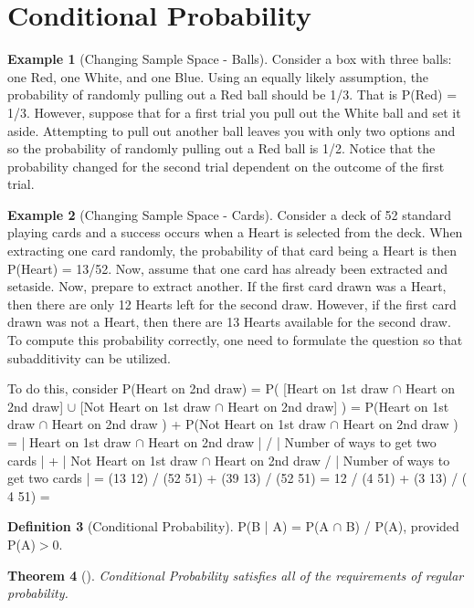 \documentclass[10pt,]{book}
\theoremstyle{plain}
\newtheorem{theorem}{Theorem}[section]
\theoremstyle{definition}
\newtheorem{definition}[theorem]{Definition}
\theoremstyle{definition}
\newtheorem{example}[theorem]{Example}
\numberwithin{equation}{section}
\newcommand{\gt}{ > }
\begin{document}
\section[Conditional Probability]{Conditional Probability}\label{section-19}
\begin{example}[Changing Sample Space - Balls]\label{example-12}
Consider a box with three balls: one Red, one White, and one Blue.  Using an equally likely assumption, the probability of randomly pulling out a Red ball should be 1/3.  That is P(Red) = 1/3.  However, suppose that for a first trial you pull out the White ball and set it aside. Attempting to pull out another ball leaves you with only two options and so the probability of randomly pulling out a Red ball is 1/2. Notice that the probability changed for the second trial dependent on the outcome of the first trial.%
\end{example}
\begin{example}[Changing Sample Space - Cards]\label{example-13}
Consider a deck of 52 standard playing cards and a success occurs when a Heart is selected from the deck. 
	When extracting one card randomly, the probability	of that card being a Heart is then P(Heart) = 13/52. Now, assume that one card has already been extracted and setaside.  Now, prepare to extract another. If the first card drawn was a Heart, then there are only 12 Hearts left for the second draw. However, if the first card drawn was not a Heart, then there are 13 Hearts available for the second draw. To compute this probability correctly, one need to formulate the question so that subadditivity can  be utilized.%
\par

	To do this, consider 
	P(Heart on 2nd draw) 
	= P( [Heart on 1st draw \(\cap\) Heart on 2nd draw] \(\cup\) [Not Heart on 1st draw \(\cap\) Heart on 2nd draw] )
	= P(Heart on 1st draw \(\cap\) Heart on 2nd draw ) + P(Not Heart on 1st draw \(\cap\) Heart on 2nd draw )
	= | Heart on 1st draw \(\cap\) Heart on 2nd draw | / | Number of ways to get two cards |
	+ | Not Heart on 1st draw \(\cap\) Heart on 2nd draw / | Number of ways to get two cards |
	= (13 12) / (52 51) + (39 13) / (52 51) = 12 / (4 51) + (3 13) / ( 4 51) =  

\end{example}
\begin{definition}[Conditional Probability]\label{definition-23}
P(B | A) = P(A \(\cap\) B) / P(A), provided P(A)\(\gt 0\).\end{definition}
\begin{theorem}[]\label{theorem-21}
Conditional Probability satisfies all of the requirements of regular probability.\end{theorem}
\end{document}
